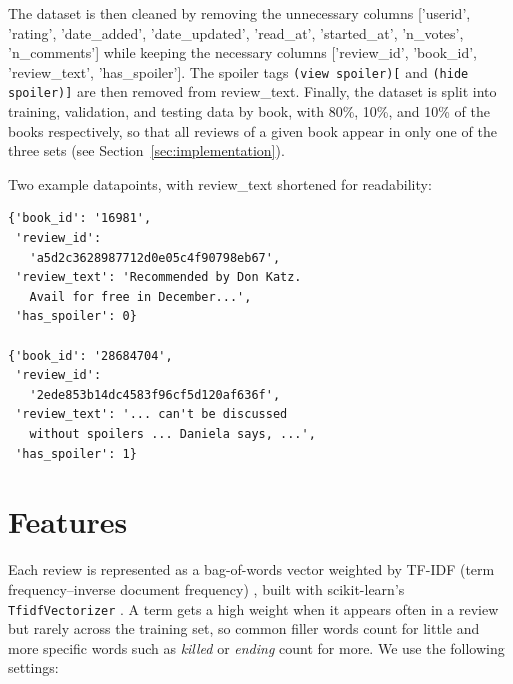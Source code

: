 \documentclass[11pt]{article}
\begin{document}
The dataset is then cleaned by removing the unnecessary columns ['userid', 'rating', 'date\_added', 'date\_updated', 'read\_at', 'started\_at', 'n\_votes', 'n\_comments'] while keeping the necessary columns ['review\_id', 'book\_id', 'review\_text', 'has\_spoiler']. The spoiler tags \texttt{(view spoiler)[} and \texttt{(hide spoiler)]} are then removed from review\_text. Finally, the dataset is split into training, validation, and testing data by book, with 80\%, 10\%, and 10\% of the books respectively, so that all reviews of a given book appear in only one of the three sets (see Section~\ref{sec:implementation}).
 
Two example datapoints, with review\_text shortened for readability:

{\footnotesize
\begin{verbatim}
{'book_id': '16981',
 'review_id':
   'a5d2c3628987712d0e05c4f90798eb67',
 'review_text': 'Recommended by Don Katz.
   Avail for free in December...',
 'has_spoiler': 0}

{'book_id': '28684704',
 'review_id':
   '2ede853b14dc4583f96cf5d120af636f',
 'review_text': '... can't be discussed
   without spoilers ... Daniela says, ...',
 'has_spoiler': 1}
\end{verbatim}
}

\section{Features}

Each review is represented as a bag-of-words vector weighted by TF-IDF (term frequency--inverse document frequency) \citep{salton1988term}, built with scikit-learn's \texttt{TfidfVectorizer} \citep{pedregosa2011scikit}. A term gets a high weight when it appears often in a review but rarely across the training set, so common filler words count for little and more specific words such as \emph{killed} or \emph{ending} count for more. We use the following settings:
\end{document}
